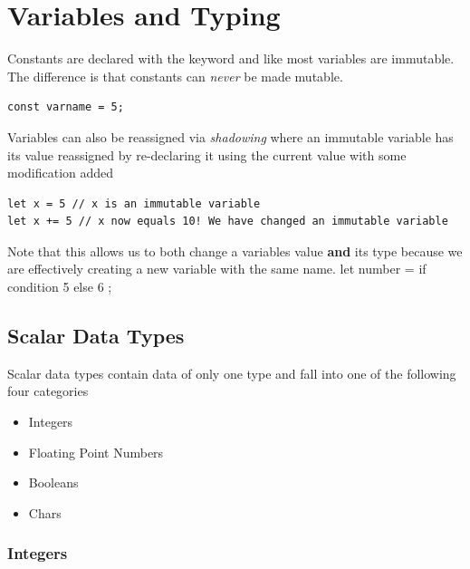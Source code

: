 \documentclass[]{article}
\begin{document}
\section{Variables and Typing}

Constants are declared with the keyword  and like most variables are immutable.
The difference is that constants can \emph{never} be made mutable.
\begin{verbatim}
const varname = 5;
\end{verbatim}
Variables can also be reassigned via \emph{shadowing} where an immutable variable has its value reassigned by re-declaring it using the current value with some modification added
\begin{verbatim}
let x = 5 // x is an immutable variable
let x += 5 // x now equals 10! We have changed an immutable variable
\end{verbatim}
Note that this allows us to both change a variables value \textbf{and} its type because we are effectively creating a new variable with the same name.
let number = if condition { 5 } else { 6 };
\subsection{Scalar Data Types}

Scalar data types contain data of only one type and fall into one of the following four categories
\begin{itemize}
    \item Integers
    \item Floating Point Numbers
    \item Booleans
    \item Chars
\end{itemize}
\subsubsection{Integers}
\end{document}
